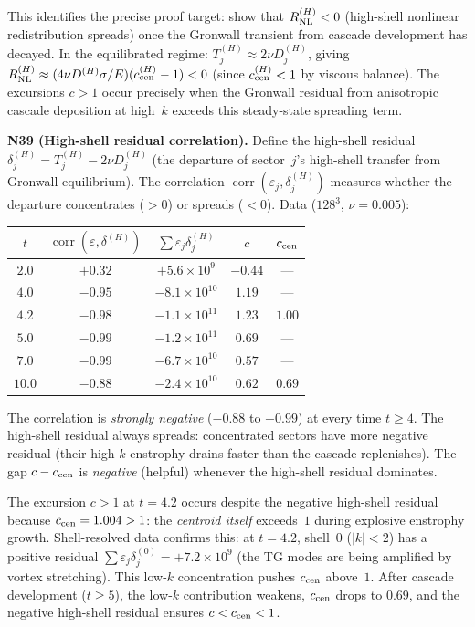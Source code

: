 \documentclass[11pt]{article}
\theoremstyle{definition}
\DeclareMathOperator{\corr}{corr}
\begin{document}
This identifies the precise proof target: show
that $R_{\rm NL}^{(H)}<0$ (high-shell nonlinear
redistribution spreads) once the Gronwall transient
from cascade development has decayed.  In the
equilibrated regime: $T_j^{(H)}\approx 2\nu D_j^{(H)}$,
giving $R_{\rm NL}^{(H)}\approx
(4\nu D^{(H)}\sigma/E)(c_{\rm cen}^{(H)}-1)<0$
(since $c_{\rm cen}^{(H)}<1$ by viscous balance).
The excursions $c>1$ occur precisely when the
Gronwall residual from anisotropic cascade
deposition at high~$k$ exceeds this steady-state
spreading term.

\medskip\noindent\textbf{N39 (High-shell residual
correlation).}
Define the high-shell residual
$\delta_j^{(H)} = T_j^{(H)}-2\nu D_j^{(H)}$
(the departure of sector~$j$'s high-shell transfer
from Gronwall equilibrium).  The correlation
$\corr(\varepsilon_j,\delta_j^{(H)})$ measures
whether the departure concentrates ($>0$) or
spreads ($<0$).  Data ($128^3$, $\nu=0.005$):
\begin{center}
\renewcommand{\arraystretch}{1.2}
\begin{tabular}{@{}ccccc@{}}
\toprule
$t$ & $\corr(\varepsilon,\delta^{(H)})$
  & $\sum\varepsilon_j\delta_j^{(H)}$ & $c$ & $c_{\rm cen}$ \\
\midrule
$2.0$ & $+0.32$ & $+5.6\!\times\!10^{9}$ & $-0.44$ & --- \\
$4.0$ & $-0.95$ & $-8.1\!\times\!10^{10}$ & $1.19$ & --- \\
$4.2$ & $-0.98$ & $-1.1\!\times\!10^{11}$ & $1.23$ & $1.00$ \\
$5.0$ & $-0.99$ & $-1.2\!\times\!10^{11}$ & $0.69$ & --- \\
$7.0$ & $-0.99$ & $-6.7\!\times\!10^{10}$ & $0.57$ & --- \\
$10.0$ & $-0.88$ & $-2.4\!\times\!10^{10}$ & $0.62$ & $0.69$ \\
\bottomrule
\end{tabular}
\end{center}
The correlation is \emph{strongly negative}
($-0.88$ to $-0.99$) at every time $t\geq 4$.
The high-shell residual always spreads: concentrated
sectors have more negative residual (their high-$k$
enstrophy drains faster than the cascade replenishes).
The gap $c-c_{\rm cen}$ is \emph{negative} (helpful)
whenever the high-shell residual dominates.

The excursion $c>1$ at $t=4.2$ occurs despite the
negative high-shell residual because
$c_{\rm cen}=1.004>1$: the \emph{centroid itself}
exceeds~$1$ during explosive enstrophy growth.
Shell-resolved data confirms this: at $t=4.2$,
shell~$0$ ($|k|<2$) has a positive residual
$\sum\varepsilon_j\delta_j^{(0)} = +7.2\times 10^9$
(the TG modes are being amplified by vortex
stretching).  This low-$k$ concentration pushes
$c_{\rm cen}$ above~$1$.  After cascade development
($t\geq 5$), the low-$k$ contribution weakens,
$c_{\rm cen}$ drops to $0.69$, and the negative
high-shell residual ensures $c<c_{\rm cen}<1$.
\end{document}
